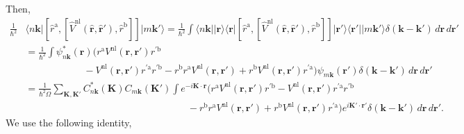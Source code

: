 Then,
\begin{align}\label{3.5}
\frac{1}{\hbar^{2}}&
\langle n\mathbf{k}\vert 
\left[
\hat{r}^{\mathrm{a}},
\left[
\hat{V}^\mathrm{nl}(\hat{\mathbf{r}},\hat{\mathbf{r}}'),\hat{r}^\mathrm{b}
\right]
\right]
\vert m\mathbf{k}'\rangle
= \frac{1}{\hbar^{2}}
\int \langle n\mathbf{k}\vert \vert\mathbf{r}\rangle\langle\mathbf{r}\vert 
\left[
\hat{r}^{\mathrm{a}},
\left[
\hat{V}^\mathrm{nl}(\hat{\mathbf{r}},\hat{\mathbf{r}}'),\hat{r}^\mathrm{b}
\right]
\right]
\vert\mathbf{r}'\rangle\langle\mathbf{r}'\vert \vert m\mathbf{k}'\rangle
\delta(\mathbf{k}-\mathbf{k}')\,d\mathbf{r}\,d\mathbf{r}'\nonumber\\
&= \frac{1}{\hbar^{2}}
\int \psi^{*}_{n\mathbf{k}}(\mathbf{r})
\Big(
  r^{\mathrm{a}}V^\mathrm{nl}(\mathbf{r},\mathbf{r}')r^{\prime\mathrm{b}}\nonumber\\
&\qquad\qquad\qquad- V^\mathrm{nl}(\mathbf{r},\mathbf{r}')r^{\prime\mathrm{a}}r^{\prime\mathrm{b}}
- r^\mathrm{b}r^{\mathrm{a}}V^\mathrm{nl}(\mathbf{r},\mathbf{r}')
+ r^\mathrm{b}V^\mathrm{nl}(\mathbf{r},\mathbf{r}')r^{\prime\mathrm{a}}
\Big)
\psi_{m\mathbf{k}}(\mathbf{r}')
\delta(\mathbf{k}-\mathbf{k}')\,d\mathbf{r}\,d\mathbf{r}'\nonumber\\
&= \frac{1}{\hbar^{2}\Omega}
\sum_{\mathbf{K},\mathbf{K}'}
C^{*}_{n\mathbf{k}}(\mathbf{K})C_{m\mathbf{k}}(\mathbf{K}')
\int e^{-i\mathbf{K}\cdot\mathbf{r}}
\Big(
  r^{\mathrm{a}}V^\mathrm{nl}(\mathbf{r},\mathbf{r}')r^{\prime\mathrm{b}}
- V^\mathrm{nl}(\mathbf{r},\mathbf{r}')r^{\prime\mathrm{a}}r^{\prime\mathrm{b}}
\nonumber\\
&\hspace{7cm} -
  r^\mathrm{b}r^{\mathrm{a}}V^\mathrm{nl}(\mathbf{r},\mathbf{r}')
+ r^\mathrm{b}V^\mathrm{nl}(\mathbf{r},\mathbf{r}')r^{\prime\mathrm{a}}
\Big) 
e^{i\mathbf{K}'\cdot\mathbf{r}'}
\delta(\mathbf{k}-\mathbf{k}')\,d\mathbf{r}\,d\mathbf{r}'.
\end{align} 
We use the following identity,
